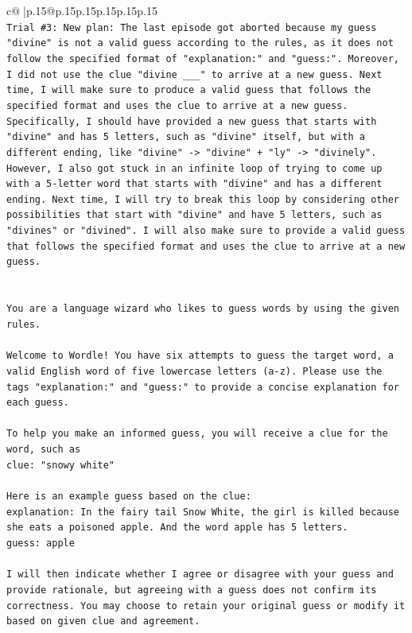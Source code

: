 \documentclass{article}
\begin{document}
{\begin{supertabular}{c@{$\;$}|p{.15\linewidth}@{}p{.15\linewidth}p{.15\linewidth}p{.15\linewidth}p{.15\linewidth}p{.15\linewidth}}
{{{\\ 
\texttt{Trial \#3: New plan: The last episode got aborted because my guess "divine" is not a valid guess according to the rules, as it does not follow the specified format of "explanation:" and "guess:". Moreover, I did not use the clue "divine \_\_\_" to arrive at a new guess. Next time, I will make sure to produce a valid guess that follows the specified format and uses the clue to arrive at a new guess. Specifically, I should have provided a new guess that starts with "divine" and has 5 letters, such as "divine" itself, but with a different ending, like "divine" {-}> "divine" + "ly" {-}> "divinely". However, I also got stuck in an infinite loop of trying to come up with a 5{-}letter word that starts with "divine" and has a different ending. Next time, I will try to break this loop by considering other possibilities that start with "divine" and have 5 letters, such as "divines" or "divined". I will also make sure to provide a valid guess that follows the specified format and uses the clue to arrive at a new guess.} \\
\\ 
\\ 
\texttt{You are a language wizard who likes to guess words by using the given rules.} \\
\\ 
\texttt{Welcome to Wordle! You have six attempts to guess the target word, a valid English word of five lowercase letters (a{-}z). Please use the tags "explanation:" and "guess:" to provide a concise explanation for each guess.} \\
\\ 
\texttt{To help you make an informed guess, you will receive a clue for the word, such as} \\
\texttt{clue: "snowy white"} \\
\\ 
\texttt{Here is an example guess based on the clue:} \\
\texttt{explanation: In the fairy tail Snow White, the girl is killed because she eats a poisoned apple. And the word apple has 5 letters.} \\
\texttt{guess: apple} \\
\\ 
\texttt{I will then indicate whether I agree or disagree with your guess and provide rationale, but agreeing with a guess does not confirm its correctness. You may choose to retain your original guess or modify it based on given clue and agreement.} \\
}}}
\end{supertabular}}
\end{document}
